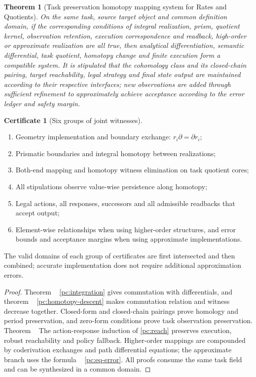 \documentclass[11pt,a4paper]{article}
\theoremstyle{plain}
\newtheorem{theorem}{Theorem}[section]
\theoremstyle{definition}
\newtheorem*{certificate}{Certificate}
\theoremstyle{remark}
\begin{document}
\begin{CJK*}
\begin{theorem}
[Task preservation homotopy mapping system for Rates and Quotients]\label{pc:comparison-main}
On the same task, source target object and common definition domain, if the corresponding conditions of integral realization, prism, quotient kernel, observation retention, execution correspondence and readback, high-order or approximate realization are all true, then analytical differentiation, semantic differential, task quotient, homotopy change and finite execution form a compatible system. It is stipulated that the cohomology class and its closed-chain pairing, target reachability, legal strategy and final state output are maintained according to their respective interfaces; new observations are added through sufficient refinement to approximately achieve acceptance according to the error ledger and safety margin.\end{theorem}
\begin{certificate}
[Six groups of joint witnesses]\begin{enumerate}
\item
Geometry implementation and boundary exchange: $r_i\partial=\partial r_i$;\item
Prismatic boundaries and integral homotopy between realizations;\item
Both-end mapping and homotopy witness elimination on task quotient cores;\item
All stipulations observe value-wise persistence along homotopy;\item
Legal actions, all responses, successors and all admissible readbacks that accept output;\item
Element-wise relationships when using higher-order structures, and error bounds and acceptance margins when using approximate implementations.\end{enumerate}
The valid domains of each group of certificates are first intersected and then combined; accurate implementation does not require additional approximation errors.\end{certificate}
\begin{proof}
Theorem ~ \ref{pc:integration} gives commutation with differentials, and theorem ~ \ref{pc:homotopy-descent} makes commutation relation and witness decrease together. Closed-form and closed-chain pairings prove homology and period preservation, and zero-form conditions prove task observation preservation. Theorem ~ The action-response induction of \ref{pc:reach} preserves execution, robust reachability and policy fallback. Higher-order mappings are compounded by coderivation exchanges and path differential equations; the approximate branch uses the formula ~ \eqref{pc:eq-error}. All proofs consume the same task field and can be synthesized in a common domain.\end{proof}



\end{CJK*}
\end{document}
